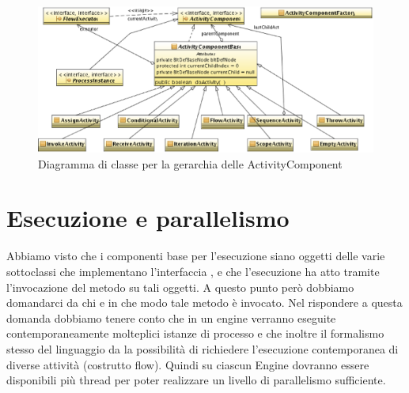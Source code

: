 \begin{figure}[p]
\begin{center}
\includegraphics[angle=90,scale=0.80]
{architettura_interna/dia/actclass}
\caption[Gerarchia delle ActivityComponent]{
   	\textsf{{\small Diagramma di classe per la gerarchia delle
   	ActivityComponent}} }
  \label{fig:actclass}
\end{center}
\end{figure}

\section{Esecuzione e parallelismo}
Abbiamo visto che i componenti base per l'esecuzione siano oggetti delle varie
sottoclassi che implementano l'interfaccia , e che
l'esecuzione ha atto tramite l'invocazione del metodo
 su tali oggetti. A questo punto però dobbiamo
domandarci da chi e in che modo tale metodo è invocato. Nel rispondere a questa
domanda dobbiamo tenere conto che in un engine verranno eseguite
contemporaneamente molteplici istanze di processo e che inoltre il formalismo
stesso del linguaggio da la possibilità di richiedere l'esecuzione contemporanea
di diverse attività (costrutto flow). Quindi su ciascun Engine dovranno essere
disponibili più thread per poter realizzare un livello di
parallelismo sufficiente.

